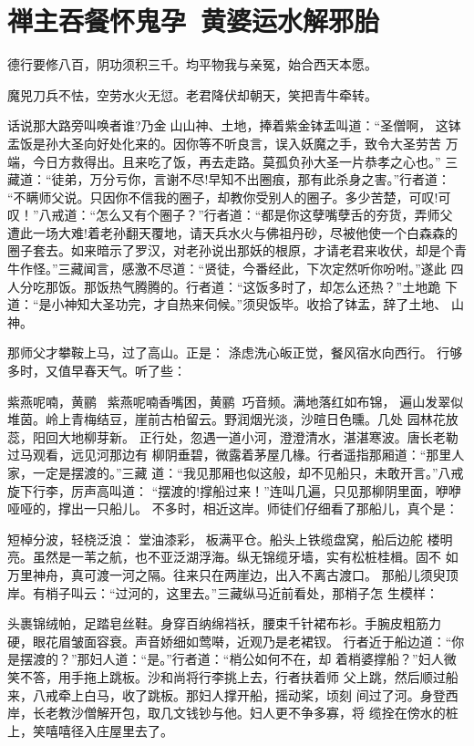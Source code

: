 \chapter{禅主吞餐怀鬼孕~黄婆运水解邪胎}

德行要修八百，阴功须积三千。均平物我与亲冤，始合西天本愿。

魔兕刀兵不怯，空劳水火无愆。老君降伏却朝天，笑把青牛牵转。

话说那大路旁叫唤者谁?乃金山山神、土地，捧着紫金钵盂叫道：“圣僧啊，
这钵盂饭是孙大圣向好处化来的。因你等不听良言，误入妖魔之手，致令大圣劳苦
万端，今日方救得出。且来吃了饭，再去走路。莫孤负孙大圣一片恭孝之心也。”
三藏道：“徒弟，万分亏你，言谢不尽!早知不出圈痕，那有此杀身之害。”行者道：
“不瞒师父说。只因你不信我的圈子，却教你受别人的圈子。多少苦楚，可叹!可
叹！”八戒道：“怎么又有个圈子？”行者道：“都是你这孽嘴孽舌的夯货，弄师父
遭此一场大难!着老孙翻天覆地，请天兵水火与佛祖丹砂，尽被他使一个白森森的
圈子套去。如来暗示了罗汉，对老孙说出那妖的根原，才请老君来收伏，却是个青
牛作怪。”三藏闻言，感激不尽道：“贤徒，今番经此，下次定然听你吩咐。”遂此
四人分吃那饭。那饭热气腾腾的。行者道：“这饭多时了，却怎么还热？”土地跪
下道：“是小神知大圣功完，才自热来伺候。”须臾饭毕。收拾了钵盂，辞了土地、
山神。

那师父才攀鞍上马，过了高山。正是：
涤虑洗心皈正觉，餐风宿水向西行。
行够多时，又值早春天气。听了些：

紫燕呢喃，黄鹂：紫燕呢喃香嘴困，黄鹂巧音频。满地落红如布锦，
遍山发翠似堆茵。岭上青梅结豆，崖前古柏留云。野润烟光淡，沙暄日色曛。几处
园林花放蕊，阳回大地柳芽新。
正行处，忽遇一道小河，澄澄清水，湛湛寒波。唐长老勒过马观看，远见河那边有
柳阴垂碧，微露着茅屋几椽。行者遥指那厢道：“那里人家，一定是摆渡的。”三藏
道：“我见那厢也似这般，却不见船只，未敢开言。”八戒旋下行李，厉声高叫道：
“摆渡的!撑船过来！”连叫几遍，只见那柳阴里面，咿咿哑哑的，撑出一只船儿。
不多时，相近这岸。师徒们仔细看了那船儿，真个是：

短棹分波，轻桡泛浪：堂油漆彩，板满平仓。船头上铁缆盘窝，船后边舵
楼明亮。虽然是一苇之航，也不亚泛湖浮海。纵无锦缆牙墙，实有松桩桂楫。固不
如万里神舟，真可渡一河之隔。往来只在两崖边，出入不离古渡口。
那船儿须臾顶岸。有梢子叫云：“过河的，这里去。”三藏纵马近前看处，那梢子怎
生模样：

头裹锦绒帕，足踏皂丝鞋。身穿百纳绵裆袄，腰束千针裙布衫。手腕皮粗筋力
硬，眼花眉皱面容衰。声音娇细如莺啭，近观乃是老裙钗。
行者近于船边道：“你是摆渡的？”那妇人道：“是。”行者道：“梢公如何不在，却
着梢婆撑船？”妇人微笑不答，用手拖上跳板。沙和尚将行李挑上去，行者扶着师
父上跳，然后顺过船来，八戒牵上白马，收了跳板。那妇人撑开船，摇动桨，顷刻
间过了河。身登西岸，长老教沙僧解开包，取几文钱钞与他。妇人更不争多寡，将
缆拴在傍水的桩上，笑嘻嘻径入庄屋里去了。

